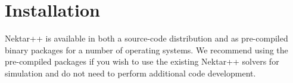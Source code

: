\chapter{Installation}

Nektar++ is available in both a source-code distribution and as
pre-compiled binary packages for a number of operating systems. We recommend
using the pre-compiled packages if you wish to use the existing Nektar++
solvers for simulation and do not need to perform additional code development.




